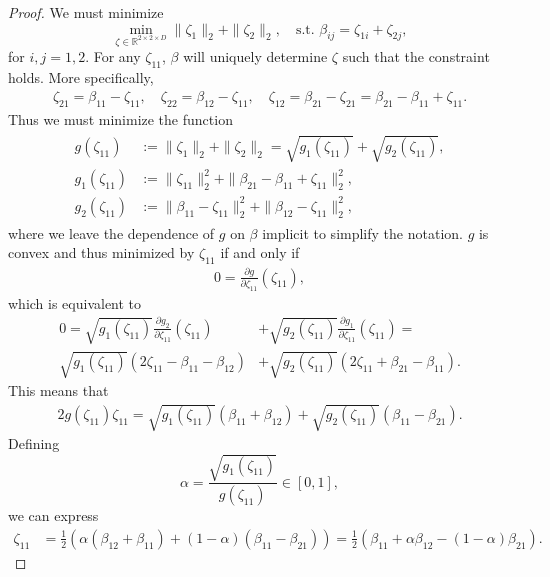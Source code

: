 \documentclass{article}
\theoremstyle{plain}
\theoremstyle{definition}
\theoremstyle{remark}
\begin{document}
\begin{proof}
We must minimize
\begin{equation}
    \min_{\zeta\in\mathbb{R}^{2\times 2\times D}}\|\zeta_1\|_2+\|\zeta_2\|_2,\quad
    \text{s.t. }\beta_{ij}=\zeta_{1i}+\zeta_{2j},
\end{equation}
for $i,j=1,2$.
For any $\zeta_{11}$, $\beta$ will uniquely determine $\zeta$ such that the constraint holds. More specifically,
\begin{align*}
    \zeta_{21}=\beta_{11}-\zeta_{11},\quad
    \zeta_{22}=\beta_{12}-\zeta_{11},\quad
    \zeta_{12}=\beta_{21}-\zeta_{21}=\beta_{21}-\beta_{11}+\zeta_{11}.
\end{align*}
Thus we must minimize the function
\begin{align}
\begin{aligned}
    g(\zeta_{11})&:=\|\zeta_1\|_2+\|\zeta_2\|_2=\sqrt{g_1(\zeta_{11})}+\sqrt{g_2(\zeta_{11})},\\
    g_1(\zeta_{11})&:=\|\zeta_{11}\|_2^2+\|\beta_{21}-\beta_{11}+\zeta_{11}\|_2^2,\\
    g_2(\zeta_{11})&:=\|\beta_{11}-\zeta_{11}\|_2^2+\|\beta_{12}-\zeta_{11}\|_2^2,
\end{aligned}
\end{align}
where we leave the dependence of $g$ on $\beta$ implicit to simplify the notation.
$g$ is convex and thus minimized by $\zeta_{11}$ if and only if
\begin{align*}
    0=\frac{\partial g}{\partial\zeta_{11}}(\zeta_{11}),
\end{align*}
which is equivalent to
\begin{align*}
    0
    =\sqrt{g_1(\zeta_{11})}\frac{\partial g_2}{\partial\zeta_{11}}(\zeta_{11})&+
    \sqrt{g_2(\zeta_{11})}\frac{\partial g_1}{\partial\zeta_{11}}(\zeta_{11})=\\
    \sqrt{g_1(\zeta_{11})}(2\zeta_{11}-\beta_{11}-\beta_{12})
    &+\sqrt{g_2(\zeta_{11})}(2\zeta_{11}+\beta_{21}-\beta_{11}).
\end{align*}
This means that
\begin{align*}
    2g(\zeta_{11})\zeta_{11}=\sqrt{g_1(\zeta_{11})}(\beta_{11}+\beta_{12})+\sqrt{g_2(\zeta_{11})}(\beta_{11}-\beta_{21}).
\end{align*}
Defining
\begin{equation}
    \alpha=\frac{\sqrt{g_1(\zeta_{11})}}{g(\zeta_{11})}\in[0,1],
\end{equation}
we can express
\begin{align*}
\zeta_{11}&=\tfrac12\left(\alpha(\beta_{12}+\beta_{11})+(1-\alpha)(\beta_{11}-\beta_{21})\right)=\tfrac12\left(\beta_{11}+\alpha\beta_{12}-(1-\alpha)\beta_{21}\right).

\end{align*}
\end{proof}
\end{document}
